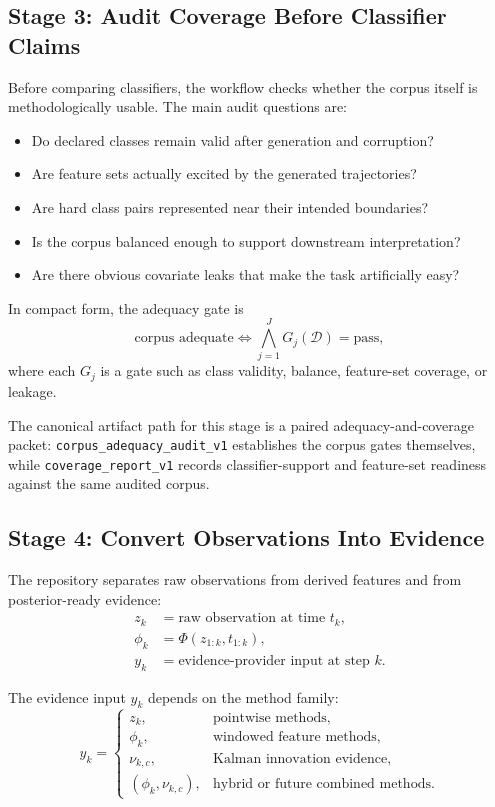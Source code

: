 \documentclass[11pt]{article}
\begin{document}
\subsection{Stage 3: Audit Coverage Before Classifier Claims}
Before comparing classifiers, the workflow checks whether the corpus itself is methodologically usable. The main audit questions are:
\begin{itemize}[leftmargin=1.5em]
  \item Do declared classes remain valid after generation and corruption?
  \item Are feature sets actually excited by the generated trajectories?
  \item Are hard class pairs represented near their intended boundaries?
  \item Is the corpus balanced enough to support downstream interpretation?
  \item Are there obvious covariate leaks that make the task artificially easy?
\end{itemize}

In compact form, the adequacy gate is
\begin{equation}
\text{corpus adequate}
\Longleftrightarrow
\bigwedge_{j=1}^{J} G_j(\mathcal{D}) = \text{pass},
\end{equation}
where each \(G_j\) is a gate such as class validity, balance, feature-set coverage, or leakage.

The canonical artifact path for this stage is a paired adequacy-and-coverage packet: \texttt{corpus\_adequacy\_audit\_v1} establishes the corpus gates themselves, while \texttt{coverage\_report\_v1} records classifier-support and feature-set readiness against the same audited corpus.

\subsection{Stage 4: Convert Observations Into Evidence}
The repository separates raw observations from derived features and from posterior-ready evidence:
\begin{align}
z_k &= \text{raw observation at time } t_k, \\
\phi_k &= \Phi(z_{1:k}, t_{1:k}), \\
y_k &= \text{evidence-provider input at step } k.
\end{align}

The evidence input \(y_k\) depends on the method family:
\begin{equation}
y_k =
\begin{cases}
z_k, & \text{pointwise methods}, \\
\phi_k, & \text{windowed feature methods}, \\
\nu_{k,c}, & \text{Kalman innovation evidence}, \\
(\phi_k, \nu_{k,c}), & \text{hybrid or future combined methods}.
\end{cases}
\end{equation}
\end{document}
